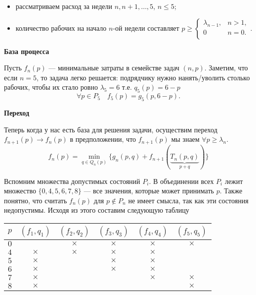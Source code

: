 \begin{itemize}[nosep]
	\item рассматриваем расход за недели $n, n+1, \dots, 5$, $n \le 5$;
	
	\item количество рабочих на начало $n$-ой недели составляет $p \ge \begin{cases}
		\lambda_{n - 1},& n > 1, \\
		 0& n = 0. \\
	\end{cases}$.
\end{itemize}

\bigskip

\textbf{База процесса}

Пусть $f_n(p)$ --- минимальные затраты в семействе задач $(n, p)$. Заметим, что если $n = 5$, то задача легко решается: подрядчику нужно нанять/уволить столько рабочих, чтобы их стало ровно $\lambda_5 = 6$ т.е. $q_5(p) = 6 - p$
\[
\forall p \in P_5 \quad f_5(p) = g_5(p, 6 - p).
\]

\bigskip

\textbf{Переход}

Теперь когда у нас есть база для решения задачи, осуществим переход $f_{n+1}(p) \to f_n(p)$ в предположении, что $f_{n+1}(p)$ мы знаем $\forall p \ge \lambda_{n}$.
\[
\boxed{f_n(p) = \min_{q \in Q_n(p)} \Big\{ g_n(p, q) + f_{n + 1}(\underbrace{T_n(p, q)}_{p + q}) \Big\}}\tag{**}
\]

Вспомним множества допустимых состояний $P_i$. В объединении всех $P_i$ лежит множество $\{0, 4, 5, 6, 7, 8\}$ --- все значения, которые может принимать $p$. Также понятно, что считать $f_n(p)$ для $p \notin P_n$ не имеет смысла, так как эти состояния недопустимы. Исходя из этого составим следующую таблицу

\begin{table}[H]
	\centering
	\begin{tabular}{ | c | c | c | c | c | c | } 
		\hline
		$p$ & $(f_1, q_1)$ & $(f_2, q_2)$ & $(f_3, q_3)$ & $(f_4, q_4)$ & $(f_5, q_5)$ \\ 
		\hline
		$0$ & & $\times$ & $\times$ & $\times$ & $\times$ \\\hline
		$4$ & $\times$ & $\times$ & $\times$ & $\times$ & \\\hline
		$5$ & $\times$ & & $\times$ & $\times$ & \\\hline
		$6$ & $\times$ & & $\times$ & $\times$ & \\\hline
		$7$ & $\times$ & & & $\times$ & $\times$ \\\hline
		$8$ & $\times$ & & & & $\times$ \\\hline
	\end{tabular}
\end{table}

